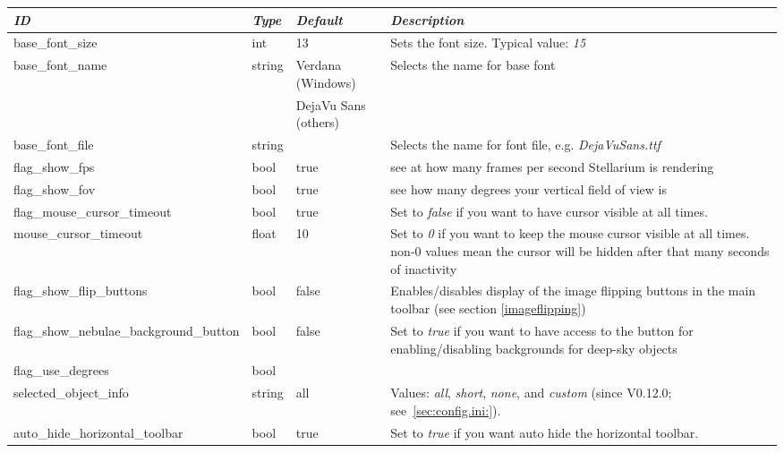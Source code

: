 \begin{longtabu} to \textwidth {l|l|l|X}
\toprule
\emph{ID} & \emph{Type} & \emph{Default} & \emph{Description}\\\midrule
base\_font\_size & int    & 13 & Sets the font size. Typical value: \emph{15}\\\midrule
base\_font\_name & string & Verdana (Windows)    & Selects the name for base font\\
                 &        & DejaVu Sans (others) & \\\midrule
base\_font\_file & string & & Selects the name for font file, e.g. \emph{DejaVuSans.ttf}\\\midrule
flag\_show\_fps                 & bool   & true & see at how many frames per second Stellarium is rendering\\\midrule
flag\_show\_fov                 & bool   & true & see how many degrees your vertical field of view is\\\midrule
flag\_mouse\_cursor\_timeout    & bool  & true  & Set to \emph{false} if you want to have cursor visible at all times.\\\midrule
mouse\_cursor\_timeout          & float & 10    & Set to \emph{0} if you want to keep the mouse cursor visible at all times. 
                                                  non-0 values mean the cursor will be hidden after that many seconds of inactivity\\\midrule
flag\_show\_flip\_buttons       & bool  & false & Enables/disables display of the image flipping buttons in the main 
                                                  toolbar (see section \ref{imageflipping})\\\midrule
flag\_show\_nebulae\_background\_button & bool & false & Set to \emph{true} if you want to have access to the 
                                                         button for enabling/disabling backgrounds for deep-sky objects\\\midrule
flag\_use\_degrees              & bool   &&\\\midrule
selected\_object\_info          & string & all  & Values: \emph{all}, \emph{short}, \emph{none}, 
                                                  and \emph{custom} (since V0.12.0; see~\ref{sec:config.ini:}).\\\midrule
auto\_hide\_horizontal\_toolbar & bool   & true & Set to \emph{true} if you want auto hide the horizontal toolbar.\\\midrule

\end{longtabu}
